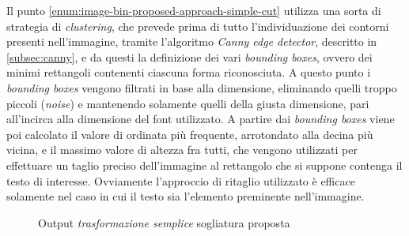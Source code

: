 Il punto \ref{enum:image-bin-proposed-approach-simple-cut} utilizza una sorta di strategia di \textit{clustering}, che prevede prima di tutto l'individuazione dei contorni presenti nell'immagine, tramite l'algoritmo \textit{Canny edge detector}, descritto in \ref{subsec:canny}, e da questi la definizione dei vari \textit{bounding boxes}, ovvero dei minimi rettangoli contenenti ciascuna forma riconosciuta. A questo punto i \textit{bounding boxes} vengono filtrati in base alla dimensione, eliminando quelli troppo piccoli (\textit{noise}) e mantenendo solamente quelli della giusta dimensione, pari all'incirca alla dimensione del font utilizzato. A partire dai \textit{bounding boxes} viene poi calcolato il valore di ordinata pi\`u frequente, arrotondato alla decina pi\`u vicina, e il massimo valore di altezza fra tutti, che vengono utilizzati per effettuare un taglio preciso dell'immagine al rettangolo che si suppone contenga il testo di interesse. Ovviamente l'approccio di ritaglio utilizzato \`e efficace solamente nel caso in cui il testo sia l'elemento preminente nell'immagine.
\begin{figure}[H]
	\centering
	\caption{Output \textit{trasformazione semplice} sogliatura proposta}
	\label{fig:image-bin-proposed-approach-simple}
\end{figure}
\setcounter{totalnumber}{1}

